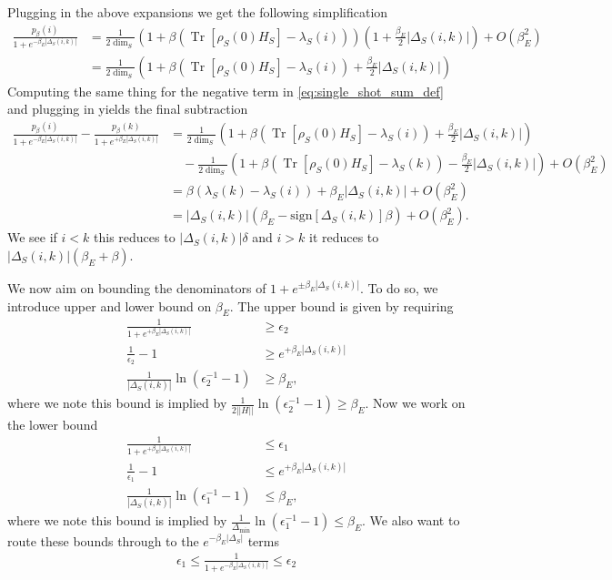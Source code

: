 \documentclass{article}
\newcommand{\parens}[1]{\left( #1 \right)}
\newcommand{\brackets}[1]{\left[ #1 \right]}
\newcommand{\norm}[1]{\left| \left| #1 \right| \right|}
\newcommand{\bigo}[1]{O\left( #1 \right)}
\DeclareMathOperator{\Tr}{Tr}
\newcommand{\trace}[1]{\Tr \brackets{ #1 }}
\begin{document}
Plugging in the above expansions we get the following simplification
\begin{align}
    \frac{p_{\beta}(i)}{1 + e^{-\beta_E |\Delta_S(i,k)|}} &= \frac{1}{2\dim_S}\parens{1 + \beta (\trace{\rho_S(0) H_S} - \lambda_S(i))}\parens{1 + \frac{\beta_E}{2}|\Delta_S(i,k)|} + \bigo{\beta_E^2} \\
    &= \frac{1}{2\dim_S}\parens{1 + \beta (\trace{\rho_S(0) H_S} - \lambda_S(i)) + \frac{\beta_E}{2}|\Delta_S(i,k)|}
\end{align}
Computing the same thing for the negative term in \ref{eq:single_shot_sum_def} and plugging in yields the final subtraction
\begin{align}
    \frac{p_{\beta}(i)}{1 + e^{-\beta_E |\Delta_S(i,k)|}} - \frac{p_{\beta}(k)}{1 + e^{+\beta_E |\Delta_S(i,k)|}} &= \frac{1}{2\dim_S}\parens{1 + \beta (\trace{\rho_S(0) H_S} - \lambda_S(i)) + \frac{\beta_E}{2}|\Delta_S(i,k)|} \\
    &\quad - \frac{1}{2\dim_S}\parens{1 + \beta (\trace{\rho_S(0) H_S} - \lambda_S(k)) - \frac{\beta_E}{2}|\Delta_S(i,k)|} + \bigo{\beta_E^2} \\
    &= \beta (\lambda_S(k) - \lambda_S(i)) + \beta_E |\Delta_S(i,k)| +\bigo{\beta_E^2}\\
    &= |\Delta_S(i,k)| \parens{\beta_E - \text{sign} \left[\Delta_S(i,k)\right] \beta} + \bigo{\beta_E^2}.
\end{align}
We see if $i < k$ this reduces to $|\Delta_S(i,k)| \delta$ and $i > k$ it reduces to $|\Delta_S(i,k)| (\beta_E + \beta)$. 

\newpage

We now aim on bounding the denominators of $1 + e^{\pm \beta_E |\Delta_S(i,k)|}$. To do so, we introduce upper and lower bound on $\beta_E$. The upper bound is given by requiring 
\begin{align}
    \frac{1}{1 + e^{+\beta_E |\Delta_S(i,k)|}} &\geq \epsilon_2 \\
    \frac{1}{\epsilon_2} - 1 &\geq e^{+\beta_E |\Delta_S(i,k)|} \\
    \frac{1}{|\Delta_S(i,k)|} \ln (\epsilon_2^{-1} - 1) &\geq \beta_E,
\end{align}
where we note this bound is implied by $\frac{1}{2 \norm{H}} \ln(\epsilon_2^{-1} - 1 ) \geq \beta_E$. Now we work on the lower bound
\begin{align}
    \frac{1}{1 + e^{+\beta_E |\Delta_S(i,k)|}} &\leq \epsilon_1 \\
    \frac{1}{\epsilon_1} - 1 &\leq e^{+\beta_E |\Delta_S(i,k)|} \\
    \frac{1}{|\Delta_S(i,k)|} \ln (\epsilon_1^{-1} - 1) &\leq \beta_E,
\end{align}
where we note this bound is implied by $\frac{1}{\Delta_{\min}} \ln (\epsilon_1^{-1} - 1) \leq \beta_E$. We also want to route these bounds through to the $e^{-\beta_E |\Delta_S|}$ terms
\begin{align}
    \epsilon_1 \leq \frac{1}{1 + e^{-\beta_E |\Delta_S(i,k)|}} \leq \epsilon_2
\end{align}
\end{document}
